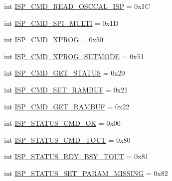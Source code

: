 \begin{DoxyCompactItemize}
\item 
int \hyperlink{classsoftware_1_1chipwhisperer_1_1hardware_1_1naeusb_1_1programmer__avr_1_1AVRISP_acd4a5738624860110f76ed59fb79d4ab}{I\+S\+P\+\_\+\+C\+M\+D\+\_\+\+R\+E\+A\+D\+\_\+\+O\+S\+C\+C\+A\+L\+\_\+\+I\+S\+P} = 0x1\+C
\item 
int \hyperlink{classsoftware_1_1chipwhisperer_1_1hardware_1_1naeusb_1_1programmer__avr_1_1AVRISP_af21290619f59c7a4cb895b8525a25ff4}{I\+S\+P\+\_\+\+C\+M\+D\+\_\+\+S\+P\+I\+\_\+\+M\+U\+L\+T\+I} = 0x1\+D
\item 
int \hyperlink{classsoftware_1_1chipwhisperer_1_1hardware_1_1naeusb_1_1programmer__avr_1_1AVRISP_a3f087ab709bda5deeeb4c1d18720c128}{I\+S\+P\+\_\+\+C\+M\+D\+\_\+\+X\+P\+R\+O\+G} = 0x50
\item 
int \hyperlink{classsoftware_1_1chipwhisperer_1_1hardware_1_1naeusb_1_1programmer__avr_1_1AVRISP_abfcc819b1a929ef3810cf36fc8bf9276}{I\+S\+P\+\_\+\+C\+M\+D\+\_\+\+X\+P\+R\+O\+G\+\_\+\+S\+E\+T\+M\+O\+D\+E} = 0x51
\item 
int \hyperlink{classsoftware_1_1chipwhisperer_1_1hardware_1_1naeusb_1_1programmer__avr_1_1AVRISP_abebf09f36b1ed037f8ef29edb9dd9ada}{I\+S\+P\+\_\+\+C\+M\+D\+\_\+\+G\+E\+T\+\_\+\+S\+T\+A\+T\+U\+S} = 0x20
\item 
int \hyperlink{classsoftware_1_1chipwhisperer_1_1hardware_1_1naeusb_1_1programmer__avr_1_1AVRISP_a51fe661324e73d87ae8b6c657a2ba843}{I\+S\+P\+\_\+\+C\+M\+D\+\_\+\+S\+E\+T\+\_\+\+R\+A\+M\+B\+U\+F} = 0x21
\item 
int \hyperlink{classsoftware_1_1chipwhisperer_1_1hardware_1_1naeusb_1_1programmer__avr_1_1AVRISP_a9af41f3bc7fa2159fe6fba42a1117de3}{I\+S\+P\+\_\+\+C\+M\+D\+\_\+\+G\+E\+T\+\_\+\+R\+A\+M\+B\+U\+F} = 0x22
\item 
int \hyperlink{classsoftware_1_1chipwhisperer_1_1hardware_1_1naeusb_1_1programmer__avr_1_1AVRISP_a4e285abb4b8c7116a9e8a36c4ebb96a0}{I\+S\+P\+\_\+\+S\+T\+A\+T\+U\+S\+\_\+\+C\+M\+D\+\_\+\+O\+K} = 0x00
\item 
int \hyperlink{classsoftware_1_1chipwhisperer_1_1hardware_1_1naeusb_1_1programmer__avr_1_1AVRISP_ab51c66a3212c4ca6a24ac4438609bb13}{I\+S\+P\+\_\+\+S\+T\+A\+T\+U\+S\+\_\+\+C\+M\+D\+\_\+\+T\+O\+U\+T} = 0x80
\item 
int \hyperlink{classsoftware_1_1chipwhisperer_1_1hardware_1_1naeusb_1_1programmer__avr_1_1AVRISP_a8a1dc049f7566250426c569e0edfa71e}{I\+S\+P\+\_\+\+S\+T\+A\+T\+U\+S\+\_\+\+R\+D\+Y\+\_\+\+B\+S\+Y\+\_\+\+T\+O\+U\+T} = 0x81
\item 
int \hyperlink{classsoftware_1_1chipwhisperer_1_1hardware_1_1naeusb_1_1programmer__avr_1_1AVRISP_af34d1529a33ac9f040f3e38cb4109242}{I\+S\+P\+\_\+\+S\+T\+A\+T\+U\+S\+\_\+\+S\+E\+T\+\_\+\+P\+A\+R\+A\+M\+\_\+\+M\+I\+S\+S\+I\+N\+G} = 0x82

\end{DoxyCompactItemize}
